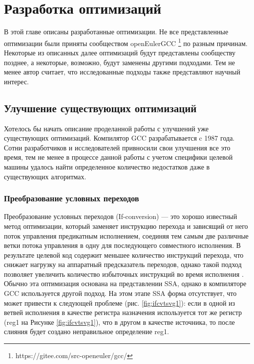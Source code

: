 \chapter{Разработка оптимизаций}\label{ch:ch2}

В этой главе описаны разработанные оптимизации. Не все представленные оптимизации были приняты сообществом openEulerGCC \footnote{https://gitee.com/src-openeuler/gcc/} по разным причинам. Некоторые из описанных далее оптимизаций будут представлены сообществу позднее, а некоторые, возможно, будут заменены другими подходами. Тем не менее автор считает, что исследованные подходы также представляют научный интерес.


\section{Улучшение существующих оптимизаций}\label{sec:ch2/sect1}
Хотелось бы начать описание проделанной работы с улучшений уже существующих оптимизаций. Компилятор GCC разрабатывается c 1987 года. Сотни разработчиков и исследователей привносили  свои улучшения все это время, тем не менее в процессе данной работы с учетом специфики целевой машины удалось найти определенное количество недостатков даже в существующих алгоритмах.
 
\subsection{Преобразование условных переходов} \label{opt:ifconv}
Преобразование условных переходов (If-conversion) — это хорошо известный метод оптимизации, который заменяет инструкцию перехода и зависящий от него поток управления предикатным исполнением, соединяя тем самым две различные ветки потока управления в одну для последующего совместного исполнения.  В результате целевой код содержит меньшее количество инструкций перехода, что снижает нагрузку на аппаратный предсказатель переходов, однако такой подход позволяет увеличить количество избыточных инструкций во время исполнения \cite{bruel2021if,E240105}. Обычно эта оптимизация основана на представлении SSA, однако в компиляторе GCC используется другой подход. На этом этапе SSA форма отсутствует, что может привести к следующей проблеме (рис. \ref{fig:ifcvtsvg1}): если в одной из ветвей исполнения в качестве регистра назначения используется  тот же регистр (reg1 на
Рисунке \ref{fig:ifcvtsvg1}), что в другом в качестве источника, то после слияния будет создано неправильное определение reg1.

